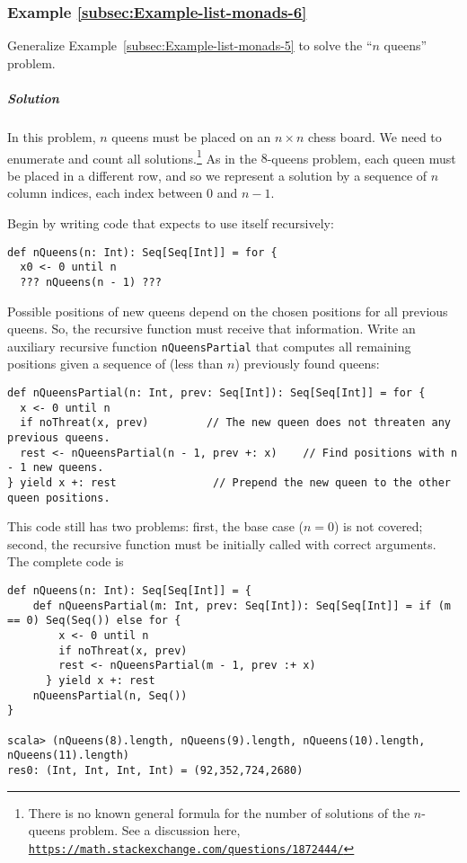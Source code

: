 \subsubsection{Example \label{subsec:Example-list-monads-6}\ref{subsec:Example-list-monads-6}}

Generalize Example~\ref{subsec:Example-list-monads-5} to solve the
\textsf{``}$n$ queens\textsf{''} problem.

\subparagraph{Solution}

In this problem, $n$ queens must be placed on an $n\times n$ chess
board. We need to enumerate and count all solutions.\footnote{There is no known general formula for the number of solutions of the
$n$-queens problem. See a discussion here, \texttt{\href{https://math.stackexchange.com/questions/1872444/}{https://math.stackexchange.com/questions/1872444/}}} As in the $8$-queens problem, each queen must be placed in a different
row, and so we represent a solution by a sequence of $n$ column indices,
each index between $0$ and $n-1$.

Begin by writing code that expects to use itself recursively:
\begin{lstlisting}
def nQueens(n: Int): Seq[Seq[Int]] = for {
  x0 <- 0 until n
  ??? nQueens(n - 1) ???
\end{lstlisting}
Possible positions of new queens depend on the chosen positions for
all previous queens. So, the recursive function must receive that
information. Write an auxiliary recursive function \lstinline!nQueensPartial!
that computes all remaining positions given a sequence of (less than
$n$) previously found queens:
\begin{lstlisting}
def nQueensPartial(n: Int, prev: Seq[Int]): Seq[Seq[Int]] = for {
  x <- 0 until n
  if noThreat(x, prev)         // The new queen does not threaten any previous queens.
  rest <- nQueensPartial(n - 1, prev +: x)    // Find positions with n - 1 new queens.
} yield x +: rest               // Prepend the new queen to the other queen positions.
\end{lstlisting}

This code still has two problems: first, the base case ($n=0$) is
not covered; second, the recursive function must be initially called
with correct arguments. The complete code is
\begin{lstlisting}
def nQueens(n: Int): Seq[Seq[Int]] = {
    def nQueensPartial(m: Int, prev: Seq[Int]): Seq[Seq[Int]] = if (m == 0) Seq(Seq()) else for {
        x <- 0 until n
        if noThreat(x, prev)
        rest <- nQueensPartial(m - 1, prev :+ x)
      } yield x +: rest
    nQueensPartial(n, Seq())
}

scala> (nQueens(8).length, nQueens(9).length, nQueens(10).length, nQueens(11).length)
res0: (Int, Int, Int, Int) = (92,352,724,2680)
\end{lstlisting}


